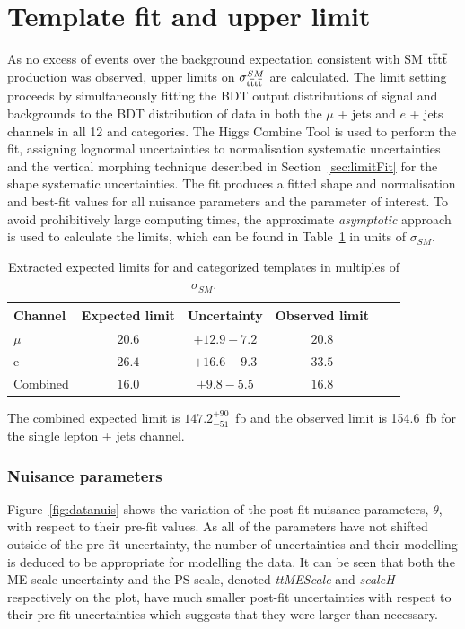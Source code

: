 \section{Template fit and upper limit}
\label{sec:limit13}
As no excess of events over the background expectation consistent with SM $\mathrm{t}\overline{\mathrm{t}}\mathrm{t}\overline{\mathrm{t}}$ production was observed, upper limits on $\sigma_{\mathrm{t}\overline{\mathrm{t}}\mathrm{t}\overline{\mathrm{t}}}^{SM}$ are calculated. 
The limit setting proceeds by simultaneously fitting the BDT output distributions of signal and backgrounds to the BDT distribution of data in both the $\mu$ + jets and $e$ + jets channels in all 12 \njets and \nMtags categories. The Higgs Combine Tool is used to perform the fit, assigning lognormal uncertainties to normalisation systematic uncertainties and the vertical morphing technique described in Section~\ref{sec:limitFit} for the shape systematic uncertainties. The fit produces a fitted shape and normalisation and best-fit values for all nuisance parameters and the parameter of interest. 
To avoid prohibitively large computing times, the approximate \emph{asymptotic} approach is used to calculate the \CLS limits, which can be found in Table~\ref{tab:limits} in units of $\sigma_{SM}$. 

\begin{table}[ht!]
\centering
\begin{tabular}{| l | c | c | c | c | c |}
  \hline
Channel  & Expected limit & Uncertainty & Observed limit\\
 \hline
$\mu$  &$20.6$ & $+12.9 -7.2$ & $20.8$ \\
 \hline
e  &  $26.4$ & $+16.6 -9.3$ & $33.5$ \\
 \hline
 Combined  &  $16.0$ & $+9.8 -5.5$ & $16.8$ \\
 \hline
\end{tabular}
 \caption{Extracted expected limits for \njets and \nMtags categorized templates in multiples of $\sigma_{SM}$.}
  \label{tab:limits}
  \end{table}

The combined expected limit is $147.2^{+90}_{-51}$~fb and the observed limit is 154.6~fb for the single lepton + jets channel.

\subsubsection{Nuisance parameters}

Figure~\ref{fig:datanuis} shows the variation of the post-fit nuisance parameters, $\theta$, with respect to their pre-fit values. As all of the parameters have not shifted outside of the pre-fit uncertainty, the number of uncertainties and their modelling is deduced to be appropriate for modelling the data. It can be seen that both the \ttbar ME scale uncertainty and the PS scale, denoted \emph{ttMEScale} and \emph{scaleH} respectively on the plot, have much smaller post-fit uncertainties with respect to their pre-fit uncertainties which suggests that they were larger than necessary.

